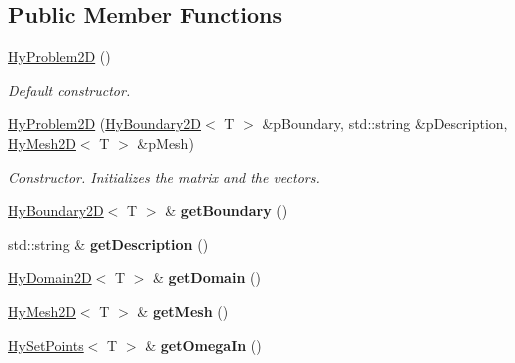 \subsection*{Public Member Functions}
\begin{DoxyCompactItemize}
\item 
\hyperlink{classHyProblem2D_a116bb99c93f87c2c7446f27eaff92827}{HyProblem2D} ()
\begin{DoxyCompactList}\small\item\em Default constructor. \item\end{DoxyCompactList}\item 
\hyperlink{classHyProblem2D_a8de2354be8948a704b063bddfc530b62}{HyProblem2D} (\hyperlink{classHyBoundary2D}{HyBoundary2D}$<$ T $>$ \&pBoundary, std::string \&pDescription, \hyperlink{classHyMesh2D}{HyMesh2D}$<$ T $>$ \&pMesh)
\begin{DoxyCompactList}\small\item\em Constructor. Initializes the matrix and the vectors. \item\end{DoxyCompactList}\item 
\hypertarget{classHyProblem2D_aa44cec625139bc2529dae74059a00525}{
\hyperlink{classHyBoundary2D}{HyBoundary2D}$<$ T $>$ \& {\bfseries getBoundary} ()}
\label{classHyProblem2D_aa44cec625139bc2529dae74059a00525}

\item 
\hypertarget{classHyProblem2D_a0a453e24682bc2628e0b4117aef21fff}{
std::string \& {\bfseries getDescription} ()}
\label{classHyProblem2D_a0a453e24682bc2628e0b4117aef21fff}

\item 
\hypertarget{classHyProblem2D_a16213d78793afe66dc02b894dd5c4e6f}{
\hyperlink{classHyDomain2D}{HyDomain2D}$<$ T $>$ \& {\bfseries getDomain} ()}
\label{classHyProblem2D_a16213d78793afe66dc02b894dd5c4e6f}

\item 
\hypertarget{classHyProblem2D_a84b8f50e257599f6ce09f05dbef48886}{
\hyperlink{classHyMesh2D}{HyMesh2D}$<$ T $>$ \& {\bfseries getMesh} ()}
\label{classHyProblem2D_a84b8f50e257599f6ce09f05dbef48886}

\item 
\hypertarget{classHyProblem2D_a10c4a73b732021245ba93f1ba806167a}{
\hyperlink{classHySetPoints}{HySetPoints}$<$ T $>$ \& {\bfseries getOmegaIn} ()}
\label{classHyProblem2D_a10c4a73b732021245ba93f1ba806167a}


\end{DoxyCompactItemize}
